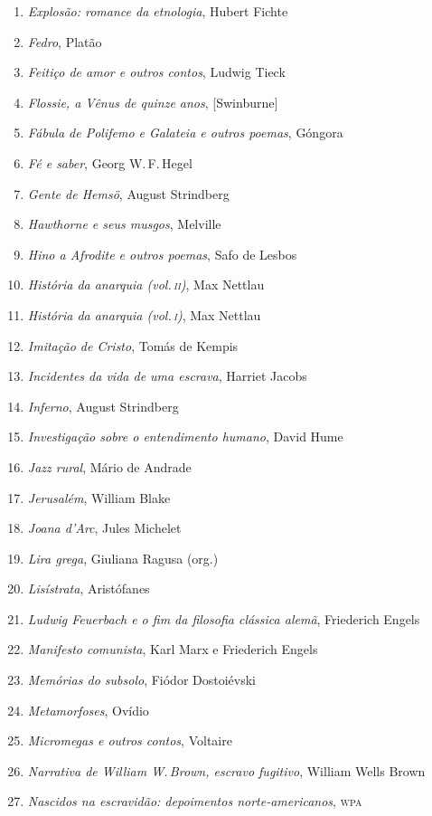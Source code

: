 \begin{enumerate}
\item \textit{Explosão: romance da etnologia}, Hubert Fichte
\item \textit{Fedro}, Platão
\item \textit{Feitiço de amor e outros contos}, Ludwig Tieck
\item \textit{Flossie, a Vênus de quinze anos}, [Swinburne]
\item \textit{Fábula de Polifemo e Galateia e outros poemas}, Góngora
\item \textit{Fé e saber}, Georg W.\,F.\,Hegel
\item \textit{Gente de Hemsö}, August Strindberg 
\item \textit{Hawthorne e seus musgos}, Melville
\item \textit{Hino a Afrodite e outros poemas}, Safo de Lesbos 
\item \textit{História da anarquia (vol.\,\textsc{ii})}, Max Nettlau
\item \textit{História da anarquia (vol.\,\textsc{i})}, Max Nettlau
\item \textit{Imitação de Cristo}, Tomás de Kempis
\item \textit{Incidentes da vida de uma escrava}, Harriet Jacobs
\item \textit{Inferno}, August Strindberg
\item \textit{Investigação sobre o entendimento humano}, David Hume
\item \textit{Jazz rural}, Mário de Andrade
\item \textit{Jerusalém}, William Blake
\item \textit{Joana d'Arc}, Jules Michelet
\item \textit{Lira grega}, Giuliana Ragusa (org.)
\item \textit{Lisístrata}, Aristófanes 
\item \textit{Ludwig Feuerbach e o fim da filosofia clássica alemã}, Friederich Engels
\item \textit{Manifesto comunista}, Karl Marx e Friederich Engels
\item \textit{Memórias do subsolo}, Fiódor Dostoiévski
\item \textit{Metamorfoses}, Ovídio
\item \textit{Micromegas e outros contos}, Voltaire
\item \textit{Narrativa de William W.\,Brown, escravo fugitivo}, William Wells Brown
\item \textit{Nascidos na escravidão: depoimentos norte-americanos}, \textsc{wpa}

\end{enumerate}
